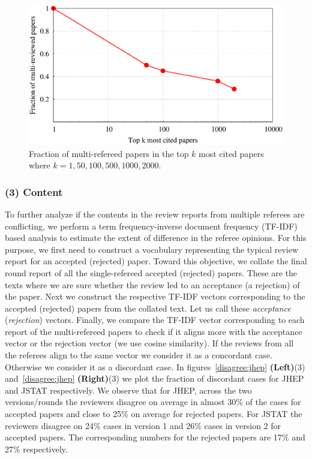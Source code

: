 \begin{figure}
 \centering
 \includegraphics[scale = 0.25]{./texfiles/Chapter_4/cikm_17/figures/best_paper.eps}
 \caption{\label{fig:best} Fraction of multi-refereed papers in the top $k$ most cited papers where $k = 1,50,100,500,1000,2000$.}
 \vspace{4mm}
\end{figure}



\subsubsection*{(3) Content}

To further analyze if the contents in the review reports 
from multiple referees are conflicting, we perform a term frequency-inverse document frequency (TF-IDF) based analysis to estimate the extent of difference in the referee 
opinions. For this purpose, we first need to construct a vocabulary representing the typical review report for an accepted (rejected) paper. Toward this objective, we collate the 
final round report of all the single-refereed accepted (rejected) papers. These are the texts where 
we are sure whether the review led to an acceptance (a rejection) of the paper. Next we construct the respective TF-IDF vectors corresponding to the accepted (rejected) 
papers from the collated text. Let us call these {\em acceptance} ({\em rejection}) vectors. Finally, we compare the TF-IDF vector corresponding to each report of the 
multi-refereed papers to check if it aligns more with
the acceptance vector or the rejection vector (we use cosine similarity). If the reviews from all the referees align to the same vector we consider it as a concordant case. Otherwise we consider 
it as a discordant case. 
In figures~\ref{disagree:jhep} {\bf(Left)}(3) and~\ref{disagree:jhep} {\bf(Right)}(3) we plot the fraction of discordant cases for JHEP and JSTAT respectively. We observe that for JHEP, 
across the two versions/rounds the reviewers disagree on average in almost 30\% of the cases for accepted papers and close to 25\% on average for rejected papers. 
For JSTAT the reviewers disagree on 24\% cases in version 1 and 26\% cases in version 2 for accepted papers. The corresponding numbers for 
the rejected papers are 17\% and 27\% respectively.

